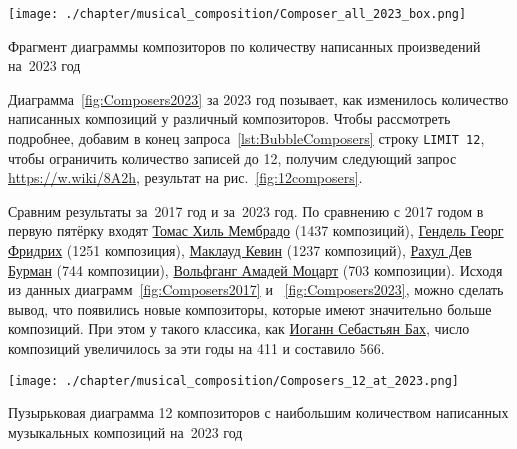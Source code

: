 %
%
\begin{marginfigure}[-6\baselineskip]
  \texttt{[image: ./chapter/musical\_composition/Composer\_all\_2023\_box.png]}
  \vspace{-7pt}
  \caption[Пузырьковая диаграмма композиторов по количеству написанных композиций на~2023 год]
    {Фрагмент диаграммы композиторов по количеству написанных произведений на~2023 год}%
  \label{fig:Composers2023}%
\end{marginfigure}

Диаграмма~\ref{fig:Composers2023} за 2023 год позывает, 
как изменилось количество написанных композиций у различный композиторов. 
Чтобы рассмотреть подробнее, 
добавим в конец запроса~\ref{lst:BubbleComposers} строку  \lstinline|LIMIT 12|, 
чтобы ограничить количество записей до 12, 
получим следующий запрос \href{https://w.wiki/8A2h}{https://w.wiki/8A2h}, 
результат на рис.~\ref{fig:12composers}. 

Сравним результаты за~2017 год и за~2023 год.
По сравнению с 2017 годом в первую пятёрку входят 
\href{https://ca.wikipedia.org/wiki/Tomàs_Gil_i_Membrado}{Томас Хиль Мембрадо} 
(\num{1437} композиций), 
\href{https://ru.wikipedia.org/wiki/Гендель,_Георг_Фридрих}{Гендель Георг Фридрих} (\num{1251} композиция), 
\href{https://ru.wikipedia.org/wiki/Маклауд,_Кевин}{Маклауд Кевин} (\num{1237} композиций), 
\href{https://en.wikipedia.org/wiki/R._D._Burman}{Рахул Дев Бурман} (\num{744} композиции), 
\href{https://ru.wikipedia.org/wiki/Моцарт,_Вольфганг_Амадей}{Вольфганг Амадей Моцарт} (\num{703} композиции). 
Исходя из данных диаграмм~\ref{fig:Composers2017} и ~\ref{fig:Composers2023}, 
можно сделать вывод, что появились новые композиторы, 
которые имеют значительно больше композиций. 
При этом у такого классика, как 
\href{https://ru.wikipedia.org/?curid=17950}{Иоганн Себастьян Бах}, 
число композиций увеличилось за эти годы на 411 и составило 566. 


\newpage
\begin{marginfigure}
  \texttt{[image: ./chapter/musical\_composition/Composers\_12\_at\_2023.png]}
  \caption[Диаграмма 12 композиторов с наибольшим количеством написанных музыкальных композиций на~2023 год]
          {Пузырьковая диаграмма 12 композиторов с наибольшим количеством написанных музыкальных композиций на~2023 год}%
  \label{fig:12composers}%
\end{marginfigure}


